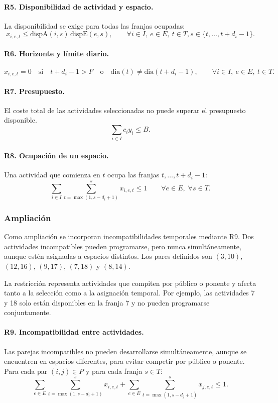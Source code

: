 \paragraph{R5. Disponibilidad de actividad y espacio.}
La disponibilidad se exige para todas las franjas ocupadas:
\[
x_{i,e,t}\leq
\mathrm{dispA}(i,s)\,\mathrm{dispE}(e,s),
\qquad
\forall i\in I,\ e\in E,\ t\in T,
s\in\{t,\ldots,t+d_i-1\}.
\]

\paragraph{R6. Horizonte y límite diario.}
\[
x_{i,e,t}=0
\quad\text{si}\quad
t+d_i-1>F
\quad\text{o}\quad
\mathrm{dia}(t)\neq\mathrm{dia}(t+d_i-1),
\qquad\forall i\in I,\ e\in E,\ t\in T.
\]

\paragraph{R7. Presupuesto.}
El coste total de las actividades seleccionadas no puede superar el presupuesto
disponible.
\[
\sum_{i\in I}c_i y_i\leq B.
\]

\paragraph{R8. Ocupación de un espacio.}
Una actividad que comienza en $t$ ocupa las franjas $t,\ldots,t+d_i-1$:
\[
\sum_{i\in I}
\sum_{t=\max(1,s-d_i+1)}^{s}
x_{i,e,t}
\leq 1
\qquad\forall e\in E,\;\forall s\in T.
\]

\subsubsection{Ampliación}

Como ampliación se incorporan incompatibilidades temporales mediante R9.
Dos actividades incompatibles pueden programarse, pero nunca simultáneamente,
aunque estén asignadas a espacios distintos. Los pares definidos son
$(3,10)$, $(12,16)$, $(9,17)$, $(7,18)$ y $(8,14)$.

La restricción representa actividades que compiten por público o ponente y
afecta tanto a la selección como a la asignación temporal. Por ejemplo, las
actividades 7 y 18 solo están disponibles en la franja 7 y no pueden
programarse conjuntamente.

\paragraph{R9. Incompatibilidad entre actividades.}
Las parejas incompatibles no pueden desarrollarse simultáneamente, aunque se
encuentren en espacios diferentes, para evitar competir por público o ponente.
Para cada par $(i,j)\in P$ y para cada franja $s\in T$:
\[
\sum_{e\in E}
\sum_{t=\max(1,s-d_i+1)}^{s}x_{i,e,t}
+
\sum_{e\in E}
\sum_{t=\max(1,s-d_j+1)}^{s}x_{j,e,t}
\leq 1.
\]

